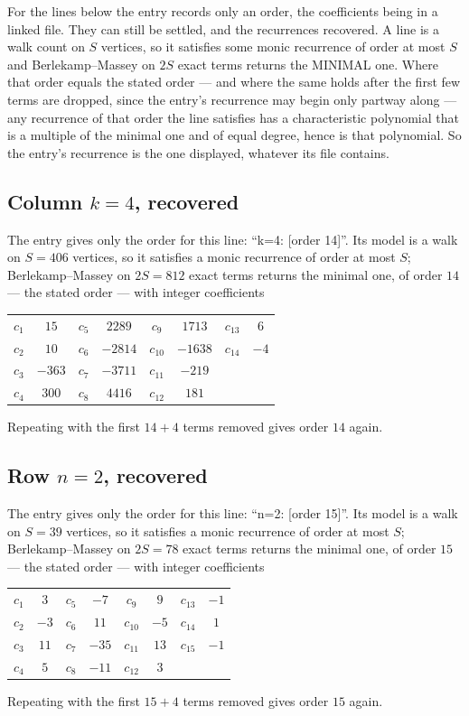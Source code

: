 \documentclass[11pt,a4paper]{article}
\theoremstyle{plain}
\theoremstyle{definition}
\begin{document}
For the lines below the entry records only an order, the coefficients being in a linked file.
They can still be settled, and the recurrences recovered. A line is a walk count on $S$
vertices, so it satisfies some monic recurrence of order at most $S$ and Berlekamp--Massey on
$2S$ exact terms returns the MINIMAL one. Where that order equals the stated order --- and
where the same holds after the first few terms are dropped, since the entry's recurrence may
begin only partway along --- any recurrence of that order the line satisfies has a
characteristic polynomial that is a multiple of the minimal one and of equal degree, hence is
that polynomial. So the entry's recurrence is the one displayed, whatever its file contains.

\subsection*{Column $k=4$, recovered}
The entry gives only the order for this line: ``k=4: [order 14]''. Its model is a walk on
$S=406$ vertices, so it satisfies a monic recurrence of order at most $S$;
Berlekamp--Massey on $2S=812$ exact terms returns the minimal one, of order
$14$ --- the stated order --- with integer coefficients
\begin{center}\small\begin{tabular}{cccccccc}
$c_{1}$ & $15$ & $c_{5}$ & $2289$ & $c_{9}$ & $1713$ & $c_{13}$ & $6$ \\
$c_{2}$ & $10$ & $c_{6}$ & $-2814$ & $c_{10}$ & $-1638$ & $c_{14}$ & $-4$ \\
$c_{3}$ & $-363$ & $c_{7}$ & $-3711$ & $c_{11}$ & $-219$ &  &  \\
$c_{4}$ & $300$ & $c_{8}$ & $4416$ & $c_{12}$ & $181$ &  &  \\
\end{tabular}\end{center}
Repeating with the first $14+4$ terms removed gives order $14$ again.

\subsection*{Row $n=2$, recovered}
The entry gives only the order for this line: ``n=2: [order 15]''. Its model is a walk on
$S=39$ vertices, so it satisfies a monic recurrence of order at most $S$;
Berlekamp--Massey on $2S=78$ exact terms returns the minimal one, of order
$15$ --- the stated order --- with integer coefficients
\begin{center}\small\begin{tabular}{cccccccc}
$c_{1}$ & $3$ & $c_{5}$ & $-7$ & $c_{9}$ & $9$ & $c_{13}$ & $-1$ \\
$c_{2}$ & $-3$ & $c_{6}$ & $11$ & $c_{10}$ & $-5$ & $c_{14}$ & $1$ \\
$c_{3}$ & $11$ & $c_{7}$ & $-35$ & $c_{11}$ & $13$ & $c_{15}$ & $-1$ \\
$c_{4}$ & $5$ & $c_{8}$ & $-11$ & $c_{12}$ & $3$ &  &  \\
\end{tabular}\end{center}
Repeating with the first $15+4$ terms removed gives order $15$ again.
\end{document}
